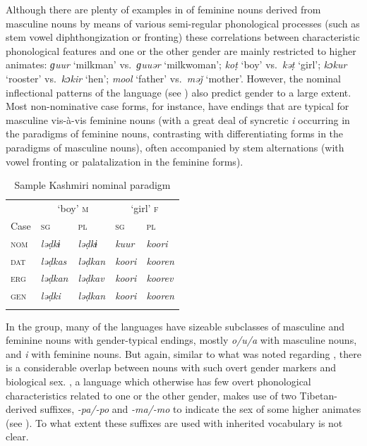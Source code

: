 \documentclass[output=collectionpaper]{langsci/langscibook}
\begin{document}
Although there are plenty of examples in  of feminine nouns derived from masculine nouns by means of various semi-regular phonological processes (such as stem vowel diphthongization or fronting) these correlations between characteristic phonological features and one or the other gender are mainly restricted to higher animates: \textit{ɡuur} `milkman' vs.\ \textit{ɡuuər} `milkwoman'; \textit{koṭ} `boy' vs.\ \textit{kəṭ} `girl'; \textit{kɔkur} `rooster' vs.\ \textit{kɔkir} `hen'; \textit{mool} `father' vs.\ \textit{məǰ} `mother'. However, the nominal inflectional patterns of the language (see ) also predict gender to a large extent. Most non-nominative case forms, for instance, have endings that are typical for masculine vis-à-vis feminine nouns (with a great deal of syncretic \textit{i} occurring in the paradigms of feminine nouns, contrasting with differentiating forms in the paradigms of masculine nouns), often accompanied by stem alternations (with vowel fronting or palatalization in the feminine forms).


\begin{table}[htb]
\begin{tabularx}{0.6\textwidth}{XXXXX}
\lsptoprule
& \multicolumn{2}{c}{`boy' \textsc{m}} & \multicolumn{2}{c}{`girl' \textsc{f}}\\
Case & \scshape sg & \scshape pl & \scshape sg & \scshape pl\\
\midrule
\scshape nom & \itshape ləḍkɨ & \itshape ləḍkɨ & \itshape kuur & \itshape koori\\
\scshape dat & \itshape ləḍkas & \itshape ləḍkan & \itshape koori & \itshape kooren\\
\scshape erg & \itshape ləḍkan & \itshape ləḍkav & \itshape koori & \itshape koorev\\
\scshape gen & \itshape ləḍki & \itshape ləḍkan & \itshape koori & \itshape kooren\\
\lspbottomrule
\end{tabularx}
\caption{Sample Kashmiri nominal paradigm \citep[909]{Koul2003}}
\label{tab:Lilje:5}
\end{table}


In the  group, many of the languages have sizeable subclasses of masculine and feminine nouns with gender-typical endings, mostly \textit{o/u/a} with masculine nouns, and \textit{i} with feminine nouns. But again, similar to what was noted regarding , there is a considerable overlap between nouns with such overt gender markers and biological sex. , a  language which otherwise has few overt phonological characteristics related to one or the other gender, makes use of two Tibetan-derived suffixes, \textit{\nobreakdash-pa/\nobreakdash-po} and \textit{\nobreakdash-ma/\nobreakdash-mo} to indicate the sex of some higher animates (see ). To what extent these suffixes are used with inherited vocabulary is not clear.
\end{document}
